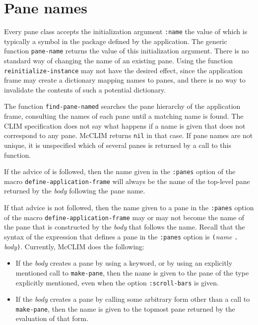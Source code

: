 \section{Pane names}

Every pane class accepts the initialization argument \texttt{:name}
the value of which is typically a symbol in the package defined by the
application.  The generic function \texttt{pane-name} returns the
value of this initialization argument.  There is no standard way of
changing the name of an existing pane.  Using the function
\texttt{reinitialize-instance} may not have the desired effect, since
the application frame may create a dictionary mapping names to panes,
and there is no way to invalidate the contents of such a potential
dictionary.

The function \texttt{find-pane-named} searches the pane hierarchy of
the application frame, consulting the names of each pane until a
matching name is found.  The CLIM specification does not say what
happens if a name is given that does not correspond to any pane.
McCLIM returns \texttt{nil} in that case.  If pane names are not
unique, it is unspecified which of several panes is returned by a call
to this function.

If the advice of  is followed, then the
name given in the \texttt{:panes} option of the macro
\texttt{define-application-frame} will always be the name of the
top-level pane returned by the \textit{body} following the pane name.

If that advice is not followed, then the name given to a pane in the
\texttt{:panes} option of the macro \texttt{define-application-frame}
may or may not become the name of the pane that is constructed by the
\textit{body} that follows the name.  Recall that the syntax of the
expression that defines a pane in the \texttt{:panes} option is
\texttt{(}\textit{name} \texttt{.} \textit{body}\texttt{)}.
Currently, McCLIM does the following:

\begin{itemize}
\item If the \textit{body} creates a pane by using a keyword, or by
  using an explicitly mentioned call to \texttt{make-pane}, then the
  name is given to the pane of the type explicitly mentioned, even
  when the option \texttt{:scroll-bars} is given.
\item If the \textit{body} creates a pane by calling some arbitrary
  form other than a call to \texttt{make-pane}, then the name is
  given to the topmost pane returned by the evaluation of that form.
\end{itemize}

